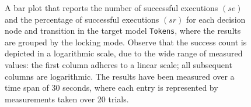 \begin{figure}[h!]
\centering
\begin{minipage}{1\textwidth}
  \centering
  \makebox[\textwidth][c]{ %
        \resizebox{1.19\textwidth}{!}{ %
            
        }%
    }%
\end{minipage}
\caption{A bar plot that reports the number of successful executions $(se)$ and the percentage of successful executions $(sr)$ for each decision node and transition in the target model \texttt{Tokens}, where the results are grouped by the locking mode. Observe that the success count is depicted in a logarithmic scale, due to the wide range of measured values: the first column adheres to a linear scale; all subsequent columns are logarithmic. The results have been measured over a time span of 30 seconds, where each entry is represented by measurements taken over 20 trials.}
\label{figure:locking_mode_transition_frequency_comparison_tokens}
\end{figure}